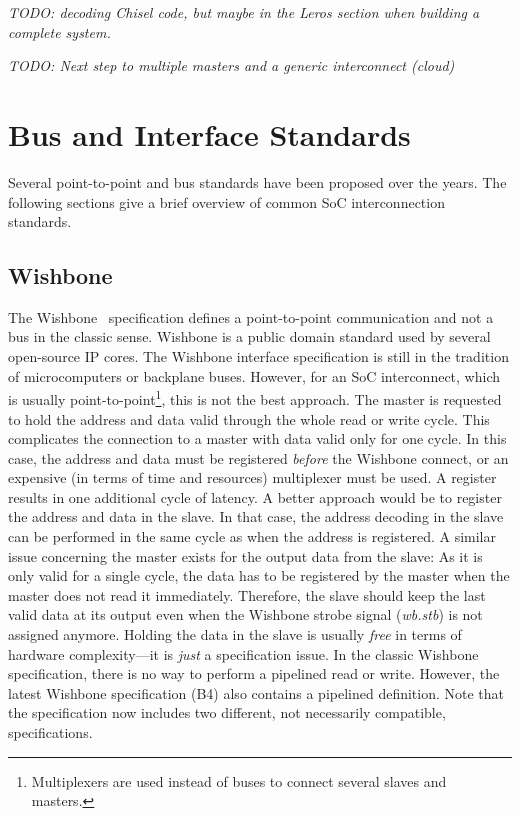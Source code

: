 \documentclass[%
    10pt,
    headinclude, footinclude=false,
    openright, %
    notitlepage,
    cleardoublepage=empty,
    headsepline,
    numbers=noenddot,
    bibliography=totoc, index=totoc,
    ]{scrbook}
\newcommand{\todo}[1]{{\emph{TODO: #1}}}
\begin{document}


\todo{decoding Chisel code, but maybe in the Leros section when building a complete system.}

\todo{Next step to multiple masters and a generic interconnect (cloud)}

\section{Bus and Interface Standards}

Several point-to-point and bus standards have been proposed over the
years. The following sections give a brief overview of common
SoC interconnection standards.

\subsection{Wishbone}

The Wishbone~\cite{soc:wishbone} specification defines
a point-to-point communication and not a bus in the classic sense.
Wishbone is a public domain standard used by
several open-source IP cores. The Wishbone interface specification
is still in the tradition of microcomputers or backplane buses.
However, for an SoC interconnect, which is usually
point-to-point\footnote{Multiplexers are used instead of buses to
connect several slaves and masters.}, this is not the best approach.
The master is requested to hold the address and data valid through
the whole read or write cycle. This complicates the connection to a
master with data valid only for one cycle. In this case, the
address and data must be registered \emph{before} the Wishbone
connect, or an expensive (in terms of time and resources) multiplexer must be
used. A register results in one additional cycle of latency. A better
approach would be to register the address and data in the slave. In
that case, the address decoding in the slave can be performed in the
same cycle as when the address is registered. A similar issue concerning
the master exists for the output data from the slave: As
it is only valid for a single cycle, the data has to be registered by
the master when the master does not read it immediately. Therefore,
the slave should keep the last valid data at its output even when
the Wishbone strobe signal (\emph{wb.stb}) is not assigned anymore.
Holding the data in the slave is usually \emph{free} in terms of
hardware complexity---it is \emph{just} a specification issue. In
the classic Wishbone specification, there is no way to perform a pipelined read
or write. However, the latest Wishbone specification (B4) also contains
a pipelined definition. Note that the specification now includes two
different, not necessarily compatible, specifications.
\end{document}
